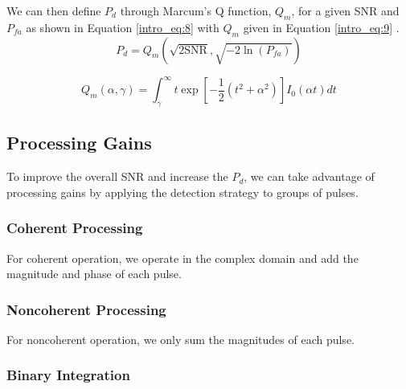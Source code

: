 We can then define $P_d$ through Marcum's Q function, $Q_m$, for a given SNR and $P_{fa}$ as shown in Equation \ref{intro_eq:8} with $Q_m$ given in Equation \ref{intro_eq:9} \cite{richards_radar}.
\begin{equation}
    \label{intro_eq:8}
P_d = Q_m\left(\sqrt{2\text{SNR}}, \sqrt{-2\ln\left(P_{fa} \right)} \right)
\end{equation}

\begin{equation}
    \label{intro_eq:9}
Q_m(\alpha,\gamma) = \int_\gamma^\infty t\exp\left[-\frac{1}{2}(t^2 + \alpha^2) \right]I_0(\alpha t) dt
\end{equation}

\subsection{Processing Gains}
To improve the overall SNR and increase the $P_d$, we can take advantage of processing gains by applying the detection strategy to groups of pulses.

\subsubsection{Coherent Processing}
For coherent operation, we operate in the complex domain and add the magnitude and phase of each pulse.

\subsubsection{Noncoherent Processing}
For noncoherent operation, we only sum the magnitudes of each pulse.

\subsubsection{Binary Integration}